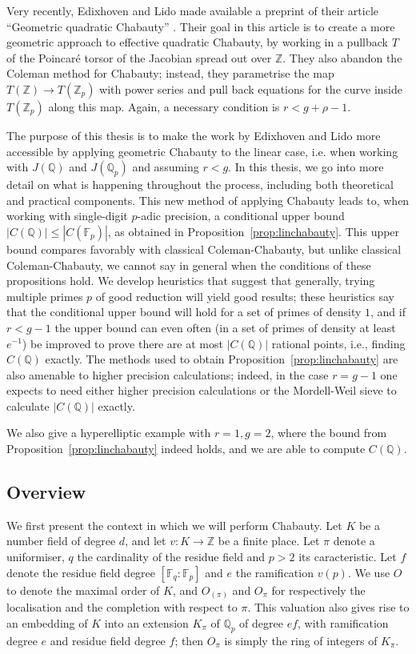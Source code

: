 \documentclass[12pt]{article}
\newcommand{\Z}{\mathbb{Z}}
\newcommand{\Q}{\mathbb{Q}}
\newcommand{\F}{\mathbb{F}}
\theoremstyle{plain}
\theoremstyle{definition}
\theoremstyle{remark}
\begin{document}
Very recently, Edixhoven and Lido made available a preprint of their article ``Geometric quadratic Chabauty'' \cite{edixhoven20}. Their goal in this article is to create a more geometric approach to effective quadratic Chabauty, by working in a pullback $T$ of the Poincar\'e torsor of the Jacobian spread out over $\Z$. They also abandon the Coleman method for Chabauty; instead, they parametrise the map $T(\Z) \to T(\Z_p)$ with power series and pull back equations for the curve inside $T(\Z_p)$ along this map. Again, a necessary condition is $r < g + \rho - 1$.

The purpose of this thesis is to make the work by Edixhoven and Lido more accessible by applying geometric Chabauty to the linear case, i.e. when working with $J(\Q)$ and $J(\Q_p)$ and assuming $r < g$. In this thesis, we go into more detail on what is happening throughout the process, including both theoretical and practical components. This new method of applying Chabauty leads to, when working with single-digit $p$-adic precision, a conditional upper bound $|C(\Q)| \leq |C(\F_p)|$, as obtained in Proposition~\ref{prop:linchabauty}. This upper bound compares favorably with classical Coleman-Chabauty, but unlike classical Coleman-Chabauty, we cannot say in general when the conditions of these propositions hold. We develop heuristics that suggest that generally, trying multiple primes $p$ of good reduction will yield good results; these heuristics say that the conditional upper bound will hold for a set of primes of density $1$, and if $r < g-1$ the upper bound can even often (in a set of primes of density at least $e^{-1}$) be improved to prove there are at most $|C(\Q)|$ rational points, i.e., finding $C(\Q)$ exactly. The methods used to obtain Proposition~\ref{prop:linchabauty} are also amenable to higher precision calculations; indeed, in the case $r = g-1$ one expects to need either higher precision calculations or the Mordell-Weil sieve to calculate $|C(\Q)|$ exactly.

We also give a hyperelliptic example with $r = 1, g = 2$, where the bound from Proposition~\ref{prop:linchabauty} indeed holds, and we are able to compute $C(\Q)$.

\subsection{Overview}
We first present the context in which we will perform Chabauty. Let $K$ be a number field of degree $d$, and let $v: K \to \Z$ be a finite place. Let $\pi$ denote a uniformiser, $q$ the cardinality of the residue field and $p> 2$ its caracteristic. Let $f$ denote the residue field degree $[\F_q : \F_p]$ and $e$ the ramification $v(p)$. We use $O$ to denote the maximal order of $K$, and $O_{(\pi)}$ and $O_{\pi}$ for respectively the localisation and the completion with respect to $\pi$. This valuation also gives rise to an embedding of $K$ into an extension $K_{\pi}$ of $\Q_p$ of degree $ef$, with ramification degree $e$ and residue field degree $f$; then $O_\pi$ is simply the ring of integers of $K_{\pi}$.
\end{document}
